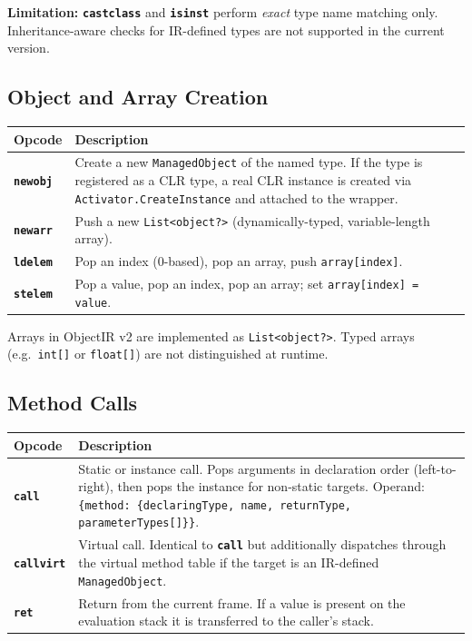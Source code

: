 \documentclass[11pt,a4paper]{article}
\newcommand{\code}[1]{\texttt{\small #1}}
\newcommand{\typename}[1]{\textcolor{typecolor}{\texttt{\small #1}}}
\newcommand{\opcode}[1]{\textbf{\texttt{#1}}}
\begin{document}
\begin{warnbox}
\textbf{Limitation:} \opcode{castclass} and \opcode{isinst} perform
\emph{exact} type name matching only. Inheritance-aware checks for IR-defined
types are not supported in the current version.
\end{warnbox}

\subsection{Object and Array Creation}

\begin{longtable}{lp{10cm}}
  \toprule
  \textbf{Opcode} & \textbf{Description} \\
  \midrule
  \endhead
  \opcode{newobj}  & Create a new \typename{ManagedObject} of the named type. If the
                     type is registered as a CLR type, a real CLR instance is created
                     via \code{Activator.CreateInstance} and attached to the wrapper. \\
  \opcode{newarr}  & Push a new \code{List<object?>} (dynamically-typed, variable-length
                     array). \\
  \opcode{ldelem}  & Pop an index (0-based), pop an array, push \code{array[index]}. \\
  \opcode{stelem}  & Pop a value, pop an index, pop an array;
                     set \code{array[index] = value}. \\
  \bottomrule
\end{longtable}

\begin{notebox}
Arrays in ObjectIR v2 are implemented as \code{List<object?>}. Typed arrays
(e.g.\ \texttt{int[]} or \texttt{float[]}) are not distinguished at runtime.
\end{notebox}

\subsection{Method Calls}

\begin{longtable}{lp{10cm}}
  \toprule
  \textbf{Opcode}  & \textbf{Description} \\
  \midrule
  \endhead
  \opcode{call}     & Static or instance call. Pops arguments in declaration order
                      (left-to-right), then pops the instance for non-static targets.
                      Operand: \code{\{method: \{declaringType, name, returnType,
                      parameterTypes[]\}\}}. \\
  \opcode{callvirt} & Virtual call. Identical to \opcode{call} but additionally
                      dispatches through the virtual method table if the target is an
                      IR-defined \typename{ManagedObject}. \\
  \opcode{ret}      & Return from the current frame. If a value is present on the
                      evaluation stack it is transferred to the caller's stack. \\
  \bottomrule
\end{longtable}
\end{document}
